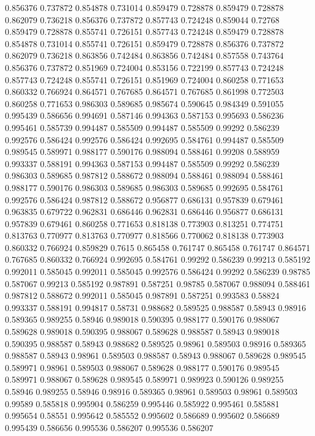0.856376 0.737872
0.854878 0.731014
0.859479 0.728878
0.859479 0.728878
0.862079 0.736218
0.856376 0.737872
0.857743 0.724248
0.859044 0.72768
0.859479 0.728878
0.855741 0.726151
0.857743 0.724248
0.859479 0.728878
0.854878 0.731014
0.855741 0.726151
0.859479 0.728878
0.856376 0.737872
0.862079 0.736218
0.863856 0.742484
0.863856 0.742484
0.857558 0.743764
0.856376 0.737872
0.851969 0.724004
0.853156 0.722199
0.857743 0.724248
0.857743 0.724248
0.855741 0.726151
0.851969 0.724004
0.860258 0.771653
0.860332 0.766924
0.864571 0.767685
0.864571 0.767685
0.861998 0.772503
0.860258 0.771653
0.986303 0.589685
0.985674 0.590645
0.984349 0.591055
0.995439 0.586656
0.994691 0.587146
0.994363 0.587153
0.995693 0.586236
0.995461 0.585739
0.994487 0.585509
0.994487 0.585509
0.99292 0.586239
0.992576 0.586424
0.992576 0.586424
0.992695 0.584761
0.994487 0.585509
0.989545 0.589971
0.988177 0.590176
0.988094 0.588461
0.99208 0.588959
0.993337 0.588191
0.994363 0.587153
0.994487 0.585509
0.99292 0.586239
0.986303 0.589685
0.987812 0.588672
0.988094 0.588461
0.988094 0.588461
0.988177 0.590176
0.986303 0.589685
0.986303 0.589685
0.992695 0.584761
0.992576 0.586424
0.987812 0.588672
0.956877 0.686131
0.957839 0.679461
0.963835 0.679722
0.962831 0.686446
0.962831 0.686446
0.956877 0.686131
0.957839 0.679461
0.860258 0.771653
0.818138 0.773903
0.813251 0.774751
0.813763 0.770977
0.813763 0.770977
0.818566 0.770062
0.818138 0.773903
0.860332 0.766924
0.859829 0.7615
0.865458 0.761747
0.865458 0.761747
0.864571 0.767685
0.860332 0.766924
0.992695 0.584761
0.99292 0.586239
0.99213 0.585192
0.992011 0.585045
0.992011 0.585045
0.992576 0.586424
0.99292 0.586239
0.98785 0.587067
0.99213 0.585192
0.987891 0.587251
0.98785 0.587067
0.988094 0.588461
0.987812 0.588672
0.992011 0.585045
0.987891 0.587251
0.993583 0.58824
0.993337 0.588191
0.994817 0.58731
0.988682 0.589525
0.988587 0.58943
0.98916 0.589365
0.989255 0.58946
0.989018 0.590395
0.988177 0.590176
0.988067 0.589628
0.989018 0.590395
0.988067 0.589628
0.988587 0.58943
0.989018 0.590395
0.988587 0.58943
0.988682 0.589525
0.98961 0.589503
0.98916 0.589365
0.988587 0.58943
0.98961 0.589503
0.988587 0.58943
0.988067 0.589628
0.989545 0.589971
0.98961 0.589503
0.988067 0.589628
0.988177 0.590176
0.989545 0.589971
0.988067 0.589628
0.989545 0.589971
0.989923 0.590126
0.989255 0.58946
0.989255 0.58946
0.98916 0.589365
0.98961 0.589503
0.98961 0.589503
0.99589 0.585818
0.995904 0.586259
0.995446 0.585922
0.995461 0.585881
0.995654 0.58551
0.995642 0.585552
0.995602 0.586689
0.995602 0.586689
0.995439 0.586656
0.995536 0.586207
0.995536 0.586207
